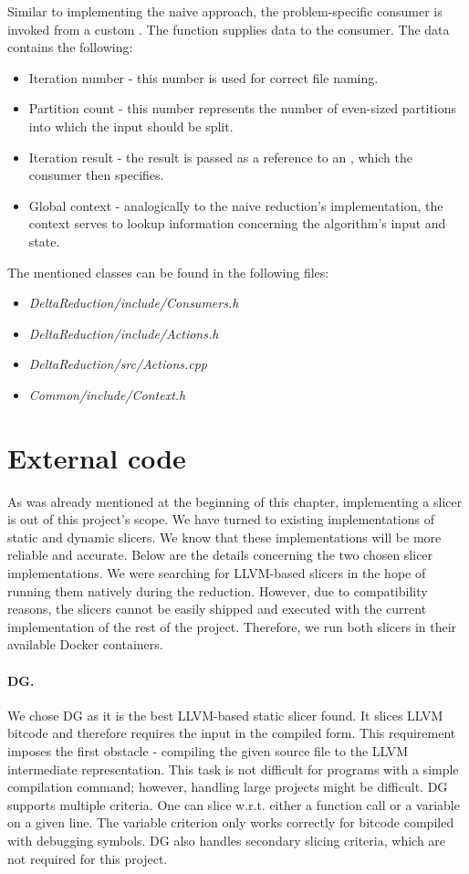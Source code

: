 Similar to implementing the naive approach, the problem-specific consumer is 
invoked from a custom . 
The  function supplies 
data to the consumer. 
The data contains the following:
\begin{itemize}
  \item Iteration number - this number is used for correct file naming.
  \item Partition count - this number represents the number of even-sized 
  partitions into which the input should be split.
  \item Iteration result - the result is passed as a reference to 
  an , which the consumer then specifies.
  \item Global context - analogically to the naive reduction's implementation, 
  the context serves to lookup information concerning the algorithm's input 
  and state.
\end{itemize}
The mentioned classes can be found in the following files: 
\begin{itemize}
  \item \emph{DeltaReduction/include/Consumers.h} 
  \item \emph{DeltaReduction/include/Actions.h} 
  \item \emph{DeltaReduction/src/Actions.cpp}
  \item \emph{Common/include/Context.h}
\end{itemize}

\section{External code}

As was already mentioned at the beginning of this chapter, implementing 
a slicer is out of this project's scope. 
We have turned to existing implementations of static and dynamic slicers. 
We know that these implementations will be more reliable and accurate. 
Below are the details concerning the two chosen slicer implementations. 
We were searching for LLVM-based slicers in the hope of running them natively 
during the reduction. 
However, due to compatibility reasons, the slicers cannot be easily shipped 
and executed with the current implementation of the rest of the project. 
Therefore, we run both slicers in their available Docker containers.

\paragraph{DG.} We chose DG as it is the best LLVM-based static slicer found. 
It slices LLVM bitcode and therefore requires the input in the compiled form. 
This requirement imposes the first obstacle - compiling the given source file 
to the LLVM intermediate representation. 
This task is not difficult for programs with a simple compilation command; 
however, handling large projects might be difficult. 
DG supports multiple criteria. 
One can slice w.r.t. either a function call or a variable on a given line. 
The variable criterion only works correctly for bitcode compiled with 
debugging symbols. 
DG also handles secondary slicing criteria, which are not required for this 
project. 

